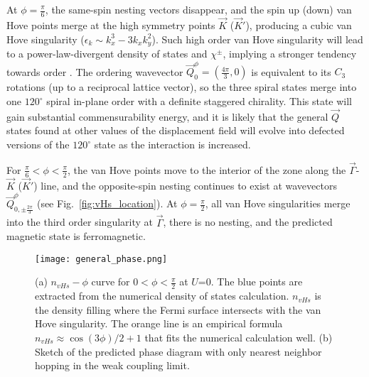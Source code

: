 \documentclass[%
reprint,
superscriptaddress,
twocolumn,
 amsmath,amssymb,
 aps,
 prb,
]{revtex4-2}
\begin{document}
At $\phi=\frac{\pi}{6}$, the same-spin nesting vectors disappear, and the spin up (down) van Hove points merge at the high symmetry points $\vec K$ ($\vec K'$), producing a cubic van Hove singularity ($\epsilon_k\sim k_x^3-3k_xk_y^2$). Such high order van Hove singularity will lead to a power-law-divergent density of states and $\chi^{\pm}$, implying a stronger tendency towards order \cite{shtyk2017electrons,yuan2019magic,bi2021excitonic,isobe2019supermetal}. The ordering wavevector $\vec{Q}^\phi_{0}=(\frac{4\pi}{3}, 0)$  is equivalent to its $C_3$ rotations (up to a reciprocal lattice vector), so the three spiral states merge into one $120^\circ$ spiral in-plane order with a definite staggered chirality. This state will gain substantial commensurability energy, and it is likely that the general $\vec{Q}$ states found at other values of the displacement field will evolve into defected versions of the $120^\circ$ state as the interaction is increased.

For $\frac{\pi}{6}<\phi<\frac{\pi}{2}$, the van Hove points move to the interior of the zone along the $\vec{\Gamma}$-$\vec K$ ($\vec K'$) line, and the opposite-spin nesting continues to exist at wavevectors $\vec{Q}^\phi_{0,\pm\frac{2\pi}{3}}$ (see Fig.~\ref{fig:vHs_location}). At $\phi=\frac{\pi}{2}$, all van Hove singularities merge into the third order singularity at $\vec{\Gamma}$, there is no nesting, and the predicted magnetic state is ferromagnetic. 


\begin{figure}[ht]
  \texttt{[image: general\_phase.png]}
  \caption{(a) $n_{vHs}-\phi$ curve for $0<\phi<\frac{\pi}{2}$ at $U$=0. The blue points are extracted from the numerical density of states calculation. $n_{vHs}$ is the density filling where the Fermi surface intersects with the van Hove singularity. The orange line is an empirical formula $n_{vHs}\approx\cos(3\phi)/2+1$ that fits the numerical calculation well. (b) Sketch of the predicted phase diagram with only nearest neighbor hopping in the weak coupling limit. }
  \label{fig:predicted_phase}
\end{figure}
\end{document}
